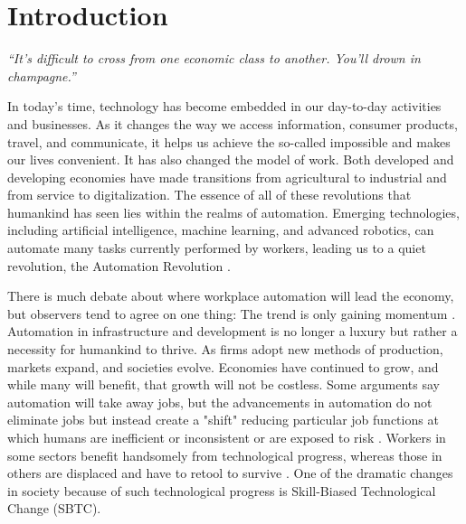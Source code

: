 \documentclass[12pt,oneside]{book} %
\begin{document}

\section{Introduction}
\label{sec:introduction}

\emph{“It's difficult to cross from one economic class to another. You'll drown in champagne.”}

\hspace{20pt}In today's time, technology has become embedded in our day-to-day activities and businesses. As it changes the way we access information, consumer products, travel, and communicate, it helps us achieve the so-called impossible and makes our lives convenient. It has also changed the model of work. Both developed and developing economies have made transitions from agricultural to industrial and from service to digitalization. The essence of all of these revolutions that humankind has seen lies within the realms of automation. Emerging technologies, including artificial intelligence, machine learning, and advanced robotics, can automate many tasks currently performed by workers, leading us to a quiet revolution, the Automation Revolution \cite{tobenkin_2019}.

There is much debate about where workplace automation will lead the economy, but observers tend to agree on one thing: The trend is only gaining momentum \cite{uzialko_2019}. Automation in infrastructure and development is no longer a luxury but rather a necessity for humankind to thrive. As firms adopt new methods of production, markets expand, and societies evolve. Economies have continued to grow, and while many will benefit, that growth will not be costless. Some arguments say automation will take away jobs, but the advancements in automation do not eliminate jobs but instead create a "shift" reducing particular job functions at which humans are inefficient or inconsistent or are exposed to risk \cite{tobenkin_2019}. Workers in some sectors benefit handsomely from technological progress, whereas those in others are displaced and have to retool to survive \cite{sumagaysay_2019}. One of the dramatic changes in society because of such technological progress is Skill-Biased Technological Change (SBTC).
\end{document}
